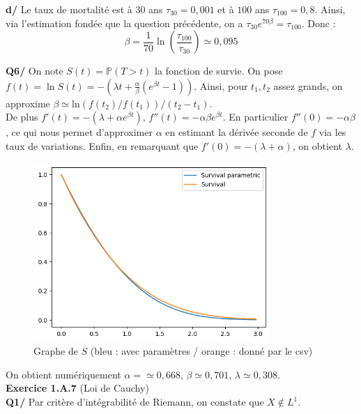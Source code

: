 \documentclass[a4paper,12pt]{article}
\newcommand{\prob}{\mathbb{P}}
\begin{document}
\textbf{d/} Le taux de mortalité est à $30$ ans $\tau_{30}=0,001$ et à $100$ ans $\tau_{100}=0,8$. Ainsi, via l'estimation fondée que la question précédente, on a $\tau_{30}e^{70 \beta} = \tau_{100}$. Donc :
$$\boxed{\beta = \frac{1}{70} \ln \left( \frac{\tau_{100}}{\tau_{30}} \right) \simeq 0,095}$$

\textbf{Q6/} On note $S(t)=\prob (T > t)$ la fonction de survie. On pose $f(t)=\ln S(t) = -(\lambda t + \frac{\alpha}{\beta} (e^{\beta t } -1))$. Ainsi, pour $t_1, t_2$ assez grands, on approxime $\beta \simeq \text{ln} \left( f(t_2)/f(t_1) \right) / (t_2-t_1)$. \\

De plus $f'(t)=-(\lambda+\alpha e^{\beta t})$, $f''(t)=-\alpha \beta e^{\beta t}$. En particulier $f''(0)=-\alpha \beta$, ce qui nous permet d'approximer $\alpha$ en estimant la dérivée seconde de $f$ via les taux de variations. Enfin, en remarquant que $f'(0)=-(\lambda + \alpha)$, on obtient $\lambda$. \\

\begin{figure}[h!]
    \centering
    \includegraphics[width=0.8\textwidth]{graphe_survival.png}
    \caption{Graphe de $S$ (bleu : avec paramètres / orange : donné par le csv)}
    \label{fig:graphe_survival}
\end{figure}

On obtient numériquement $\alpha = \simeq 0,668$, $\beta \simeq 0,701$, $\lambda \simeq 0,308$. \\

\textbf{Exercice 1.A.7} (Loi de Cauchy) \\
\textbf{Q1/} Par critère d'intégrabilité de Riemann, on constate que $\boxed{X \notin L^1}$. \\
\end{document}
